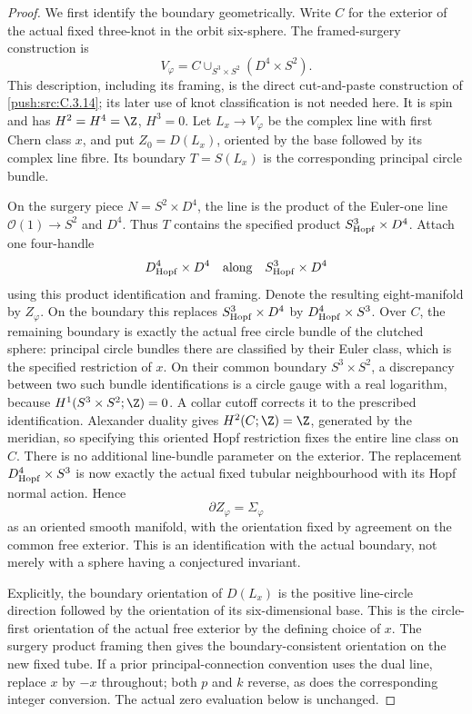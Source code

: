 \begin{proof}
We first identify the boundary geometrically. Write $C$ for the
exterior of the actual fixed three-knot in the orbit six-sphere.
The framed-surgery construction is
\[
 V_\varphi=C\cup_{S^3\times S^2}(D^4\times S^2).
\]
This description, including its framing, is the direct cut-and-paste
construction of \ref{push:src:C.3.14}; its later use of knot classification is not
needed here. It is spin and has $H^2=H^4=\Z$, $H^3=0$.
Let $L_x\to V_\varphi$ be the complex line with first Chern class
$x$, and put $Z_0=D(L_x)$, oriented by the base followed by its
complex line fibre. Its boundary $T=S(L_x)$ is the corresponding
principal circle bundle.

On the surgery piece $N=S^2\times D^4$, the line is the product
of the Euler-one line $\mathcal O(1)\to S^2$ and $D^4$.
Thus $T$ contains the specified product $S^3_{\rm Hopf}\times D^4$.
Attach one four-handle
\[
 D^4_{\rm Hopf}\times D^4
 \quad\hbox{along}\quad S^3_{\rm Hopf}\times D^4
\]
using this product identification and framing. Denote the resulting
eight-manifold by $Z_\varphi$. On the boundary this replaces
$S^3_{\rm Hopf}\times D^4$ by $D^4_{\rm Hopf}\times S^3$.
Over $C$, the remaining boundary is exactly the actual free circle
bundle of the clutched sphere: principal circle bundles there are
classified by their Euler class, which is the specified restriction
of $x$. On their common boundary $S^3\times S^2$, a discrepancy
between two such bundle identifications is a circle gauge with a
real logarithm, because $H^1(S^3\times S^2;\Z)=0$.
A collar cutoff corrects it to the prescribed identification.
Alexander duality gives $H^2(C;\Z)=\Z$, generated by the
meridian, so specifying this oriented Hopf restriction fixes the
entire line class on $C$. There is no additional line-bundle
parameter on the exterior. The replacement
$D^4_{\rm Hopf}\times S^3$ is now exactly the
actual fixed tubular neighbourhood with its Hopf normal action.
Hence
\[
 \partial Z_\varphi=\Sigma_\varphi
\]
as an oriented smooth manifold, with the orientation fixed by
agreement on the common free exterior. This is an identification
with the actual boundary, not merely with a sphere having a
conjectured invariant.

Explicitly, the boundary orientation of $D(L_x)$ is the positive
line-circle direction followed by the orientation of its
six-dimensional base. This is the circle-first orientation of
the actual free exterior by the defining choice of $x$.
The surgery product framing then gives the boundary-consistent
orientation on the new fixed tube. If a prior principal-connection
convention uses the dual line, replace $x$ by $-x$ throughout;
both $p$ and $k$ reverse, as does the corresponding integer
conversion. The actual zero evaluation below is unchanged.


\end{proof}

